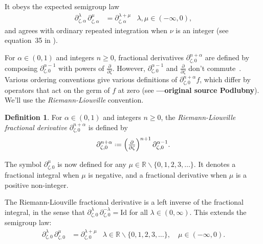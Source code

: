 \documentclass{article}
\theoremstyle{definition}
\newcommand{\R}{\mathbb{R}}
\newcommand{\fracderiv}[3]{\partial^{#1}_{#2, #3}}
\newcommand*{\defeq}{\mathrel{\vcenter{\baselineskip0.5ex \lineskiplimit0pt
                     \hbox{\scriptsize.}\hbox{\scriptsize.}}}%
                     =}
\newtheorem{definition}{Definition}[section]
\begin{document}
It obeys the expected semigroup law \cite[Section  1.3]{mladenov2014advanced}
\begin{align*}
\fracderiv{\lambda}{\zeta}{\alpha}\,\fracderiv{\mu}{\zeta}{\alpha} & = \fracderiv{\lambda+\mu}{\zeta}{\alpha} & \lambda, \mu \in (-\infty, 0),
\end{align*}
and agrees with ordinary repeated integration when $\nu$ is an integer (see equation~35 in \cite{mladenov2014advanced}).

For $\alpha \in (0, 1)$ and integers $n \ge 0$, fractional derivatives $\fracderiv{n+\alpha}{\zeta}{0}$ are defined by composing $\fracderiv{\alpha-1}{\zeta}{0}$ with powers of $\tfrac{\partial}{\partial \zeta}$. However, $\fracderiv{\alpha-1}{\zeta}{0}$ and $\tfrac{\partial}{\partial \zeta}$ don't commute~\cite[equation 54]{mladenov2014advanced}. Various ordering conventions give various definitions of $\fracderiv{n+\alpha}{\zeta}{0} f$, which differ by operators that act on the germ of $f$ at zero (see \cite[\S 1.3]{mladenov2014advanced} \textbf{---original source Podlubny}). We'll use the {\em Riemann-Liouville} convention.
\begin{definition}
For $\alpha \in (0, 1)$ and integers $n \ge 0$, the {\em Riemann-Liouville fractional derivative} $\fracderiv{n+\alpha}{\zeta}{0}$ is defined by
\[ \fracderiv{n+\alpha}{\zeta}{0} \defeq \left(\tfrac{\partial}{\partial \zeta}\right)^{n+1} \fracderiv{\alpha-1}{\zeta}{0}. \]
\end{definition}
The symbol $\fracderiv{\mu}{\zeta}{0}$ is now defined for any $\mu \in \R \smallsetminus \{0, 1, 2, 3, \ldots\}$. It denotes a fractional integral when $\mu$ is negative, and a fractional derivative when $\mu$ is a positive non-integer.

The Riemann-Liouville fractional derivative is a left inverse of the fractional integral, in the sense that $\fracderiv{\lambda}{\zeta}{ 0}\,\fracderiv{-\lambda}{\zeta}{0}=\text{Id}$ for all $\lambda \in (0, \infty)$. This extends the semigroup law:
\begin{align*}
\fracderiv{\lambda}{\zeta}{0}\,\fracderiv{\mu}{\zeta}{0} & = \fracderiv{\lambda+\mu}{\zeta}{0} & \lambda \in \R \smallsetminus \{0, 1, 2, 3, \ldots\},\quad\mu \in (-\infty, 0).
\end{align*}

\end{document}
